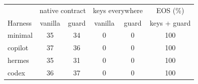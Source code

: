 \begin{tabular}{lccccc}
\toprule
 & \multicolumn{2}{c}{native contract} & \multicolumn{2}{c}{keys everywhere} & EOS (\%) \\
Harness & vanilla & guard & vanilla & guard & keys + guard \\
\midrule
minimal & 35 & 34 & 0 & 0 & 100 \\
copilot & 37 & 36 & 0 & 0 & 100 \\
hermes & 35 & 31 & 0 & 0 & 100 \\
codex & 36 & 37 & 0 & 0 & 100 \\
\bottomrule
\end{tabular}